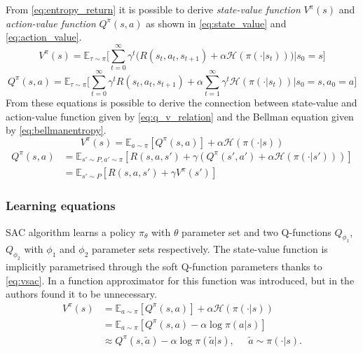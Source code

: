 From \vref{eq:entropy_return} it is possible to derive \textit{state-value function} $V^\pi(s)$ and \textit{action-value function} $Q^\pi(s,a)$ as shown in \vref{eq:state_value} and \vref{eq:action_value}.
\begin{equation} \label{eq:state_value}
	V^\pi(s) = \mathbb{E}_{\tau \sim \pi}\Bigg[\sum_{t=0}^{\infty} \gamma^t \bigg(R(s_t, a_t, s_{t+1}) + \alpha \mathcal{H}(\pi(\cdot|s_t))\bigg)\bigg|s_0 = s\Bigg]
\end{equation}
\begin{equation} \label{eq:action_value}
	Q^\pi(s,a) = \mathbb{E}_{\tau \sim \pi}\Bigg[\sum_{t=0}^{\infty} \gamma^t R(s_t, a_t, s_{t+1}) + \alpha \sum_{t=1}^{\infty} \gamma^t \mathcal{H}(\pi(\cdot|s_t))\bigg|s_0 = s, a_0 =a\Bigg]
\end{equation}
From these equations is possible to derive the connection between state-value and action-value function given by \vref{eq:q_v_relation} and the Bellman equation given by \vref{eq:bellmanentropy}.
\begin{equation} \label{eq:q_v_relation}
	V^\pi(s) = \mathbb{E}_{a\sim\pi}[Q^\pi(s,a)] + \alpha \mathcal{H}(\pi(\cdot|s))
\end{equation}
\begin{equation}
	\begin{aligned} 	\label{eq:bellmanentropy}
		Q^\pi(s,a) & = \mathbb{E}_{s'\sim P, a'\sim\pi}[R(s,a,s') + \gamma(Q^\pi(s',a') + \alpha \mathcal{H}(\pi(\cdot|s')))] \\
		           & = \mathbb{E}_{s'\sim P}[R(s,a,s') + \gamma V^\pi(s')]
	\end{aligned}
\end{equation}

\subsubsection{Learning equations}
SAC algorithm learns a policy $\pi_\theta$ with $\theta$ parameter set and two Q-functions $Q_{\phi_1}$,  $Q_{\phi_2}$ with $\phi_1$ and $\phi_2$ parameter sets respectively.
The state-value function is implicitly parametrised through the soft Q-function parameters thanks to \vref{eq:vsac}.
In \cite{haarnoja2018soft} a function approximator for this function was introduced, but in \cite{haarnoja2018alg} the authors found it to be unnecessary.
\begin{equation} \label{eq:vsac}
	\begin{aligned}
		V^{\pi}(s) & = \mathbb{E}_{a \sim \pi}[Q^{\pi}(s,a)] + \alpha \mathcal{H} \left(\pi(\cdot|s)\right)               \\
		           & = \mathbb{E}_{a \sim \pi}[Q^{\pi}(s,a) - \alpha \log \pi(a|s)]                                       \\
		           & \approx Q^{\pi}(s,\tilde{a}) - \alpha \log \pi(\tilde{a}|s), \;\;\;\;\; \tilde{a} \sim \pi(\cdot|s).
	\end{aligned}
\end{equation}

